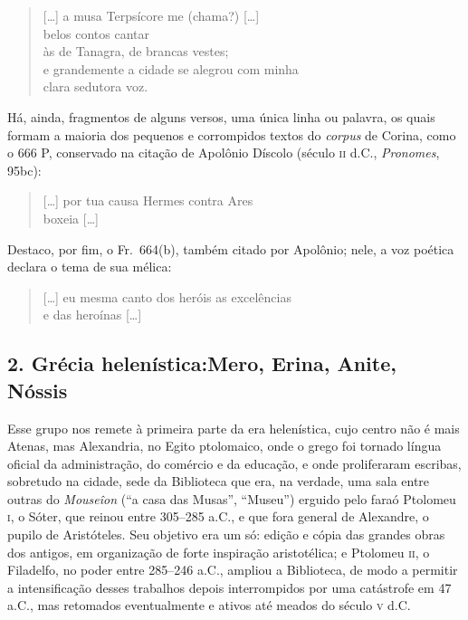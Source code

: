 \begin{quote}
\mbox[\ldots{}] a musa Terpsícore me (chama?) [\ldots{}]\\
belos contos cantar\\
às de Tanagra, de brancas vestes;\\
e grandemente a cidade se alegrou com minha\\
clara sedutora voz.
\end{quote}

Há, ainda, fragmentos de alguns versos, uma única linha ou palavra, os quais
formam a maioria dos pequenos e corrompidos textos do \textit{corpus} de
Corina, como o 666 P, conservado na citação de Apolônio Díscolo (século \textsc{ii}
d.C., \textit{Pronomes}, 95bc):

\begin{quote}
\mbox[\ldots{}] por tua causa Hermes contra Ares\\
boxeia [\ldots{}]
\end{quote}

Destaco, por fim, o Fr.~664(b), também citado por Apolônio; nele, a voz poética
declara o tema de sua mélica:

\begin{quote}
\mbox[\ldots{}] eu mesma canto dos heróis as excelências\\
e das heroínas [\ldots{}]
\end{quote}

\smallskip

\subsection*{2. Grécia helenística:\break Mero, Erina, Anite, Nóssis}

\smallskip

Esse grupo nos remete à primeira parte da era helenística, cujo centro não é
mais Atenas, mas Alexandria, no Egito ptolomaico, onde o grego foi tornado
língua oficial da administração, do comércio e da educação, e onde proliferaram
escribas, sobretudo na cidade, sede da Biblioteca que era, na
verdade, uma sala entre outras do \textit{Mouseîon} (“a casa das Musas”,
“Museu”) erguido pelo faraó Ptolomeu \textsc{i}, o Sóter, que reinou entre 305--285 a.C.,
e que fora general de Alexandre, o pupilo de Aristóteles. Seu objetivo era um
só: edição e cópia das grandes obras dos antigos, em organização de forte
inspiração aristotélica; e Ptolomeu \textsc{ii}, o Filadelfo, no poder entre 285--246
a.C., ampliou a Biblioteca, de modo a permitir a intensificação desses
trabalhos depois interrompidos por uma catástrofe em 47 a.C., mas retomados
eventualmente e ativos até meados do século \textsc{v} d.C. 

